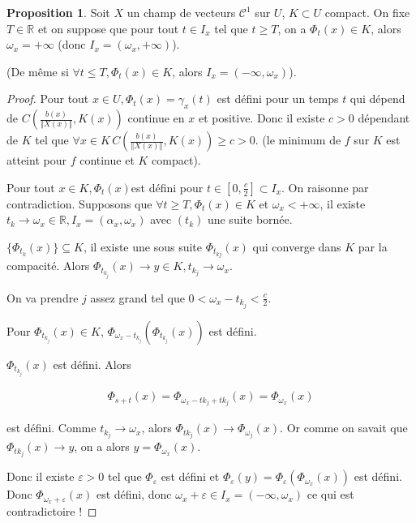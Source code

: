\documentclass[french]{article}
\theoremstyle{definition}
\newtheorem{protoproposition}{Proposition}[section]
\newenvironment{prop}
    {\colorlet{shadecolor}{blue!5}\begin{shaded}\begin{protoproposition}}
    {\end{protoproposition}\end{shaded}}
\theoremstyle{remark}
\newcommand{\lesss}{<}
\newcommand{\less}{\lesss}
\newcommand{\biggg}{>}
\newcommand{\bg}{\biggg}
\begin{document}
\begin{prop}
  Soit \(X\) un champ de vecteurs \(\mathcal{C}^1\) sur \(U\), \(K \subset U\) compact. On fixe \(T \in \mathbb{R}\) et on suppose que pour tout \(t \in I_x\) tel que \(t \geq  T\), on a \(\Phi_t(x) \in K\), alors \(\omega_x = +\infty\) (donc \(I_x = (\omega_x,+\infty)\)).

  (De même si \(\forall t \leq  T, \Phi_t(x) \in K\), alors \(I_x = (-\infty,\omega_x)\)).
\end{prop}

\begin{proof}
  Pour tout \(x \in U, \Phi_t(x) = \gamma_x(t)\) est défini pour un temps \(t\) qui  dépend de \(C\left(\frac{b(x)}{\left\Vert X(x) \right\Vert }, K(x)\right)\) continue en \(x\) et positive. Donc il existe \(c \bg 0\) dépendant de \(K\) tel que
   \(\forall x \in K\, C \left(\frac{b(x)}{\left\Vert X(x) \right\Vert }, K(x)\right) \geq c \bg 0\).
  (le minimum de \(f\) sur \(K\) est atteint pour \(f\) continue et \(K\) compact).

  Pour tout \(x \in K, \Phi_t(x)\)est défini pour \(t \in \left[0, \frac{c}{2}\right] \subset I_x\). On raisonne par contradiction. Supposons que \(\forall t \geq T, \Phi_t(x) \in K\) et \(\omega_x \less +\infty\), il existe \(t_k \longrightarrow \omega_x \in \mathbb{R}, I_x = (\alpha_x, \omega_x)\) avec \((t_k)\) une suite bornée.

  \(\{ \Phi _{t_k}(x)\}\subseteq K\), il existe une sous suite \(\Phi _{t _{kj}}(x)\) qui converge dans \(K\) par la compacité. Alors \(\Phi _{t _{k_j}} (x) \longrightarrow y \in K, t _{k_j}\longrightarrow \omega_x\).

  On va prendre \(j\) assez grand tel que \(0 \less \omega_x - t _{k_j} \less \frac{c}{2}\).

  Pour \(\Phi _{t _{k_j}}(x) \in K\), \(\Phi _{\omega_x - t _{k_j}}(\Phi _{t _{k_j}}(x))\) est défini.

  \(\Phi _{t _{k_j}}(x)\) est défini. Alors

  \begin{gather*}
    \Phi _{s+t}(x) = \Phi _{\omega_x - tk_j+tk_j}(x) = \Phi _{\omega_x}(x)
  \end{gather*}

  est défini. Comme \(t _{k_j} \longrightarrow \omega_x\), alors \(\Phi _{tk_j}(x) \longrightarrow \Phi _{\omega_j}(x)\). Or comme on savait que \(\Phi _{tk_j}(x) \longrightarrow y\), on a alors \(y = \Phi _{\omega_x}(x)\).

  Donc il existe \(\varepsilon \bg 0\) tel que \(\Phi _{\varepsilon}\) est défini et \(\Phi _{\varepsilon}(y) = \Phi _{\varepsilon} (\Phi _{\omega_x}(x))\) est défini. Donc \(\Phi _{\omega _{x}+\varepsilon}(x)\) est défini, donc \(\omega_x + \varepsilon \in I_x = (-\infty, \omega_x)\) ce qui est contradictoire !
\end{proof}
\end{document}
